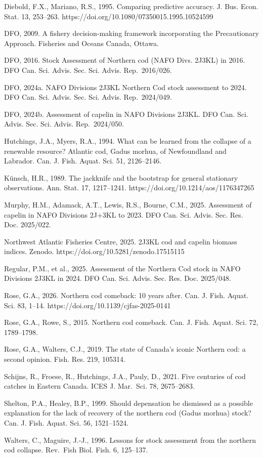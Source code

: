 \documentclass[11pt]{article}
\begin{document}
Diebold, F.X., Mariano, R.S., 1995. Comparing predictive accuracy. J.
Bus. Econ. Stat. 13, 253--263.
https://doi.org/10.1080/07350015.1995.10524599

DFO, 2009. A fishery decision-making framework incorporating the
Precautionary Approach. Fisheries and Oceans Canada, Ottawa.

DFO, 2016. Stock Assessment of Northern cod (NAFO Divs. 2J3KL) in 2016.
DFO Can. Sci. Advis. Sec. Sci. Advis. Rep.~2016/026.

DFO, 2024a. NAFO Divisions 2J3KL Northern Cod stock assessment to 2024.
DFO Can. Sci. Advis. Sec. Sci. Advis. Rep.~2024/049.

DFO, 2024b. Assessment of capelin in NAFO Divisions 2J3KL. DFO Can. Sci.
Advis. Sec. Sci. Advis. Rep.~2024/050.

Hutchings, J.A., Myers, R.A., 1994. What can be learned from the
collapse of a renewable resource? Atlantic cod, Gadus morhua, of
Newfoundland and Labrador. Can. J. Fish. Aquat. Sci. 51, 2126--2146.

K\"unsch, H.R., 1989. The jackknife and the bootstrap for general
stationary observations. Ann. Stat. 17, 1217--1241.
https://doi.org/10.1214/aos/1176347265

Murphy, H.M., Adamack, A.T., Lewis, R.S., Bourne, C.M., 2025. Assessment
of capelin in NAFO Divisions 2J+3KL to 2023. DFO Can. Sci. Advis. Sec.
Res. Doc. 2025/022.

Northwest Atlantic Fisheries Centre, 2025. 2J3KL cod and capelin biomass
indices. Zenodo. https://doi.org/10.5281/zenodo.17515115

Regular, P.M., et al., 2025. Assessment of the Northern Cod stock in
NAFO Divisions 2J3KL in 2024. DFO Can. Sci. Advis. Sec. Res. Doc.
2025/048.

Rose, G.A., 2026. Northern cod comeback: 10 years after. Can. J. Fish.
Aquat. Sci. 83, 1--14. https://doi.org/10.1139/cjfas-2025-0141

Rose, G.A., Rowe, S., 2015. Northern cod comeback. Can. J. Fish. Aquat.
Sci. 72, 1789--1798.

Rose, G.A., Walters, C.J., 2019. The state of Canada's iconic Northern
cod: a second opinion. Fish. Res. 219, 105314.

Schijns, R., Froese, R., Hutchings, J.A., Pauly, D., 2021. Five
centuries of cod catches in Eastern Canada. ICES J. Mar.~Sci. 78,
2675--2683.

Shelton, P.A., Healey, B.P., 1999. Should depensation be dismissed as a
possible explanation for the lack of recovery of the northern cod (Gadus
morhua) stock? Can. J. Fish. Aquat. Sci. 56, 1521--1524.

Walters, C., Maguire, J.-J., 1996. Lessons for stock assessment from the
northern cod collapse. Rev.~Fish Biol. Fish. 6, 125--137.
\end{document}
